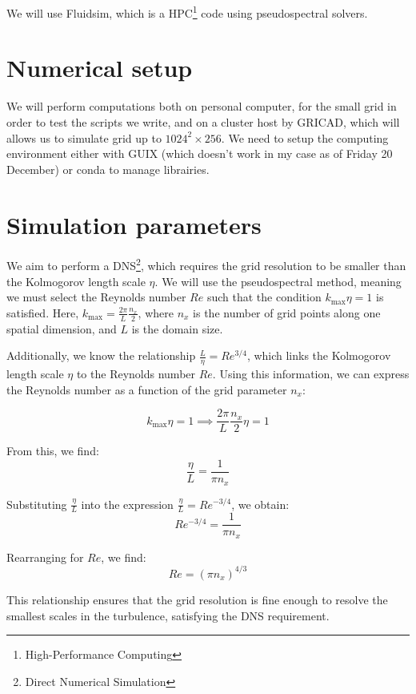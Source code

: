 We will use Fluidsim\cite{fluiddyn}, which is a HPC\footnote{High-Performance Computing} code using pseudospectral solvers.

\section{Numerical setup}
We will perform computations both on personal computer, for the small grid in order to test the scripts we write, and on a cluster host by GRICAD, which will allows us to simulate grid up to $1024^2 \times 256$. We need to setup the computing environment either with GUIX (which doesn't work in my case as of Friday 20 December) or conda to manage librairies. 

\section{Simulation parameters}
We aim to perform a DNS\footnote{Direct Numerical Simulation}, which requires the grid resolution to be smaller than the Kolmogorov length scale $\eta$. We will use the pseudospectral method, meaning we must select the Reynolds number $Re$ such that the condition $k_{\text{max}} \eta = 1$ is satisfied. Here, $k_{\text{max}} = \frac{2\pi}{L} \frac{n_x}{2}$, where $n_x$ is the number of grid points along one spatial dimension, and $L$ is the domain size.

Additionally, we know the relationship $\frac{L}{\eta} = Re^{3/4}$, which links the Kolmogorov length scale $\eta$ to the Reynolds number $Re$. Using this information, we can express the Reynolds number as a function of the grid parameter $n_x$:

\begin{equation*}
k_{\text{max}} \eta = 1 \implies \frac{2\pi}{L} \frac{n_x}{2} \eta = 1
\end{equation*}

From this, we find:
\begin{equation*}
\frac{\eta}{L} = \frac{1}{\pi n_x}
\end{equation*}

Substituting $\frac{\eta}{L}$ into the expression $\frac{\eta}{L} = Re^{-3/4}$, we obtain:
\begin{equation*}
Re^{-3/4} = \frac{1}{\pi n_x}
\end{equation*}

Rearranging for $Re$, we find:
\begin{equation}
Re = \left( \pi n_x \right)^{4/3}
\end{equation}

This relationship ensures that the grid resolution is fine enough to resolve the smallest scales in the turbulence, satisfying the DNS requirement.